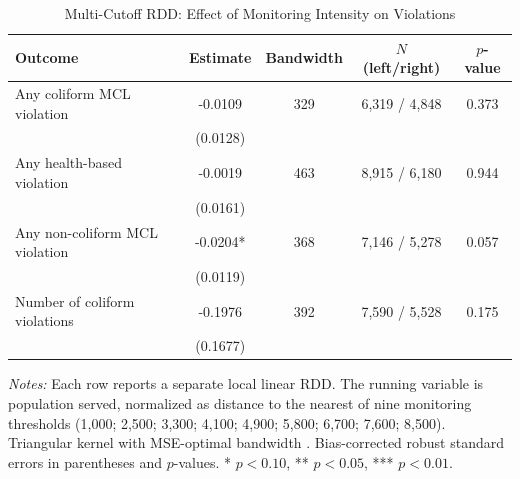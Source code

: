 \begin{table}[H]
\centering
\caption{Multi-Cutoff RDD: Effect of Monitoring Intensity on Violations}
\begin{threeparttable}
\begin{tabular}{lcccc}
\toprule
Outcome & Estimate & Bandwidth & $N$ (left/right) & $p$-value \\
\midrule
Any coliform MCL violation & -0.0109 & 329 & 6,319 / 4,848 & 0.373 \\
 & (0.0128) & & & \\
Any health-based violation & -0.0019 & 463 & 8,915 / 6,180 & 0.944 \\
 & (0.0161) & & & \\
Any non-coliform MCL violation & -0.0204* & 368 & 7,146 / 5,278 & 0.057 \\
 & (0.0119) & & & \\
Number of coliform violations & -0.1976 & 392 & 7,590 / 5,528 & 0.175 \\
 & (0.1677) & & & \\
\bottomrule
\end{tabular}
\begin{tablenotes}[flushleft]
\small
\item \textit{Notes:} Each row reports a separate local linear RDD. The running variable is population served, normalized as distance to the nearest of nine monitoring thresholds (1,000; 2,500; 3,300; 4,100; 4,900; 5,800; 6,700; 7,600; 8,500). Triangular kernel with MSE-optimal bandwidth \citep{calonico2014robust}. Bias-corrected robust standard errors in parentheses and $p$-values. * $p<0.10$, ** $p<0.05$, *** $p<0.01$.
\end{tablenotes}
\end{threeparttable}
\label{tab:main}
\end{table}
